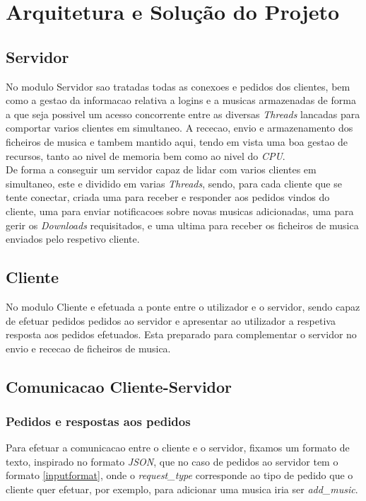 \documentclass[a4paper]{report}
\begin{document}
\chapter{Arquitetura e Solução do Projeto}

\section{Servidor}

No modulo Servidor sao tratadas todas as conexoes e pedidos dos clientes, bem
como a gestao da informacao relativa a logins e a musicas armazenadas de 
forma a que seja possivel um acesso concorrente entre as diversas 
\textit{Threads} lancadas para comportar varios clientes em simultaneo.
A rececao, envio e armazenamento dos ficheiros de musica e tambem mantido aqui,
tendo em vista uma boa gestao de recursos, tanto ao nivel de memoria bem como
ao nivel do \textit{CPU}.\\
De forma a conseguir um servidor capaz de lidar com varios clientes em
simultaneo, este e dividido em varias \textit{Threads}, sendo, para cada
cliente que se tente conectar, criada uma para receber e responder aos
pedidos vindos do cliente, uma para enviar notificacoes sobre novas musicas
adicionadas, uma para gerir os \textit{Downloads} requisitados, e uma ultima
para receber os ficheiros de musica enviados pelo respetivo cliente.

\section{Cliente}

No modulo Cliente e efetuada a ponte entre o utilizador e o servidor, sendo 
capaz de efetuar pedidos pedidos ao servidor e apresentar ao utilizador a
respetiva resposta aos pedidos efetuados. Esta preparado para complementar
o servidor no envio e rececao de ficheiros de musica.

\section{Comunicacao Cliente-Servidor}

\subsection{Pedidos e respostas aos pedidos}
Para efetuar a comunicacao entre o cliente e o servidor, fixamos
um formato de texto, inspirado no formato \textit{JSON}, que no caso
de pedidos ao servidor tem o formato \ref{inputformat}, onde o 
\textit{request\_type} corresponde ao tipo de pedido que o cliente quer
efetuar, por exemplo, para adicionar uma musica iria ser \textit{add\_music}.\\
\end{document}
